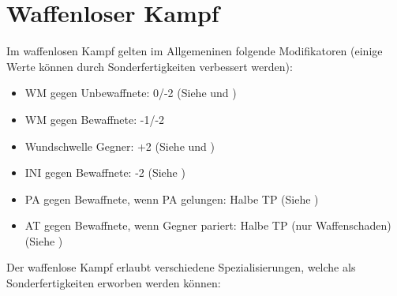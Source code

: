 %



\chapter{Waffenloser Kampf}
\label{chap.uSpez}
Im waffenlosen Kampf gelten im Allgemeninen folgende Modifikatoren (einige Werte können durch Sonderfertigkeiten verbessert werden):

\begin{itemize}
    \item WM gegen Unbewaffnete: 0/-2 (Siehe  und )
    \item WM gegen Bewaffnete: -1/-2
    \item Wundschwelle Gegner: +2 (Siehe  und )
    \item INI gegen Bewaffnete: -2 (Siehe )
    \item PA gegen Bewaffnete, wenn PA gelungen: Halbe TP (Siehe )
    \item AT gegen Bewaffnete, wenn Gegner pariert: Halbe TP (nur Waffenschaden) (Siehe )
\end{itemize}

Der waffenlose Kampf erlaubt verschiedene Spezialisierungen, welche als Sonderfertigkeiten erworben werden können:







